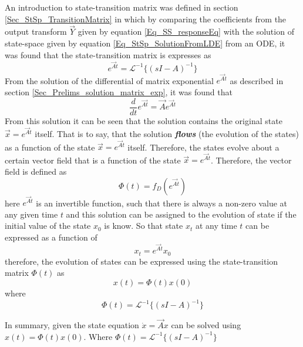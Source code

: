 An introduction to state-transition matrix was defined in section \ref{Sec_StSp_TransitionMatrix} in which by comparing the coefficients from the output transform $\vec{Y}$ given by equation \eqref{Eq_SS_responseEq} with the solution of state-space given by equation \eqref{Eq_StSp_SolutionFromLDE} from an ODE, it was found that the state-transition matrix is expresses as
\begin{equation}
	e^{\vec{A}t} = \mathcal{L}^{-1}\{(sI - A)^{-1}\}
\end{equation}
From the solution of the differential of matrix exponential $e^{\vec{A}t}$ as described in section \ref{Sec_Prelims_solution_matrix_exp}, it was found that
\begin{equation}
	\frac{d}{dt} e^{\vec{At}} = \vec{A}e^{\vec{A}t}
\end{equation}
From this solution it can be seen that the solution contains the original state $\vec{x} = e^{\vec{A}t}$ itself. That is to say, that the solution \textbf{\textit{flows}} (the evolution of the states) as a function of the state $\vec{x} = e^{\vec{A}t}$ itself. Therefore, the states evolve about a certain vector field that is a function of the state $\vec{x} = e^{\vec{A}t}$. Therefore, the vector field is defined as
\begin{equation}
	\Phi(t) = f_D(e^{\vec{A}t})
\end{equation}
here $e^{\vec{A}t}$ is an invertible function, such that there is always a non-zero value at any given time $t$ and this solution can be assigned to the evolution of state if the initial value of the state $x_0$ is know. So that state $x_t$ at any time $t$ can be expressed as a function of
\begin{equation}
	x_t = e^{\vec{A}t} x_0
\end{equation}
therefore, the evolution of states can be expressed using the state-transition matrix $\Phi(t)$ as
\begin{equation}
	x(t) = \Phi(t)x(0)
\end{equation}
where
\begin{equation}
	\Phi(t) = \mathcal{L}^{-1}\{(sI - A)^{-1}\}
\end{equation}

In summary, given the state equation $\dot{x} = \vec{A}x$ can be solved using $x(t) = \Phi(t)x(0)$. Where $\Phi(t) = \mathcal{L}^{-1}\{(sI - A)^{-1}\}$